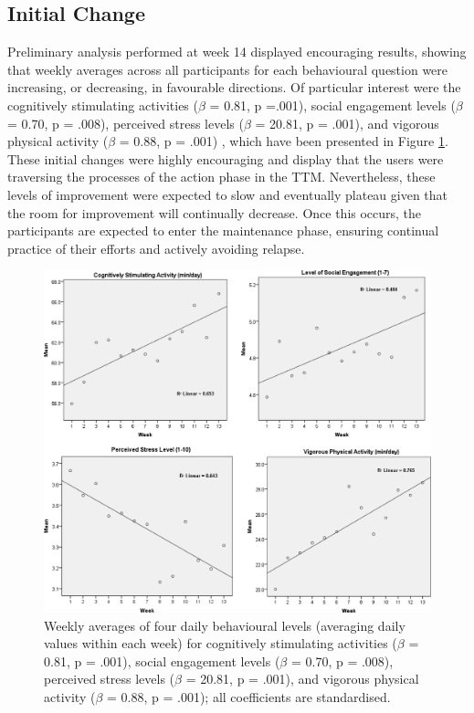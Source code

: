 \subsection{Initial Change}
Preliminary analysis performed at week 14 displayed encouraging results, showing that weekly averages across all participants for each behavioural question were increasing, or decreasing, in favourable directions. Of particular interest were the  cognitively stimulating activities ($\beta$ = 0.81, p =.001), social engagement levels ($\beta$ = 0.70, p = .008), perceived stress levels ($\beta$ = 20.81, p = .001), and vigorous physical activity ($\beta$ = 0.88, p = .001) \cite{Norton2015-TRCI}, which have been presented in Figure \ref{fig: preliminary-analysis}. These initial changes were highly encouraging and display that the users were traversing the processes of the action phase in the TTM. Nevertheless, these levels of improvement were expected to slow and eventually plateau given that the room for improvement will continually decrease. Once this occurs, the participants are expected to enter the maintenance phase, ensuring continual practice of their efforts and actively avoiding relapse.

 \begin{figure}[h]
    \centering
    \includegraphics[scale=0.25, angle=0]{Files/prevention-study-3/figures/behaviourchange-week14}
    \caption{Weekly averages of four daily behavioural levels (averaging daily values within each week) for cognitively stimulating activities ($\beta$ = 0.81, p = .001), social engagement levels ($\beta$ = 0.70, p = .008), perceived stress levels ($\beta$ = 20.81, p = .001), and vigorous physical activity ($\beta$ = 0.88, p = .001); all coefficients are standardised.}
    \label{fig: preliminary-analysis}
\end{figure}

